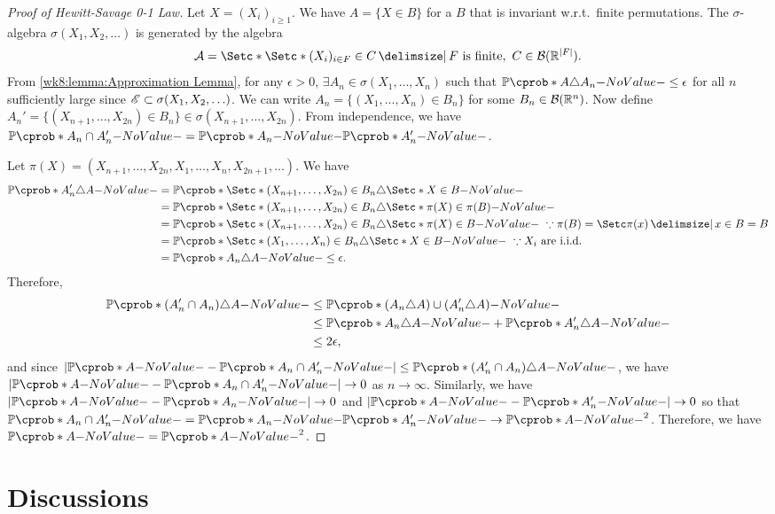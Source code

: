 \documentclass[12pt]{article}
\begin{document}
\begin{proof}[Proof of Hewitt-Savage 0-1 Law]
Let $X=(X_i)_{i\geq 1}$. We have $A=\{X\in B\}$ for a $B$ that is invariant w.r.t.\ finite permutations. The $\sigma$-algebra $\sigma(X_1,X_2,\ldots)$ is generated by the algebra
\begin{align*}
\calA = \set*{\set*{(X_i)_{i\in F}\in C} \given F \text{ is finite},\ C\in \calB(\Real^{|F|})}.
\end{align*}
From \cref{wk8:lemma:Approximation Lemma}, for any $\epsilon>0$, $\exists A_n \in \sigma(X_1,\ldots,X_n)$ such that $\P(A\triangle A_n)\leq \epsilon$ for all $n$ sufficiently large since $\mathscr{E} \subset \sigma(X_1,X_2,\ldots)$. We can write $A_n=\{ (X_1,\ldots, X_n)\in B_n\}$ for some $B_n\in \mathcal{B} (\mathbb{R} ^n)$. Now define $A_n'=\{(X_{n+1},\ldots, X_{2n})\in B_n\}\in \sigma( X_{n+1},\ldots,X_{2n})$. From independence, we have $\P(A_n\cap A_n')=\P(A_n)\P(A_n')$.  

Let $\pi(X) = (X_{n+1},\ldots,X_{2n},X_{1},\ldots,X_{n},X_{2n+1},\ldots)$. We have 
\begin{align*}
\P(A_n'\triangle A)
&=\P(\set*{(X_{n+1},\ldots,X_{2n})\in B_n}\triangle \set*{X\in B})\\
&=\P(\set*{(X_{n+1},\ldots,X_{2n})\in B_n}\triangle \set*{\pi(X)\in \pi(B)})\\
&=\P(\set*{(X_{n+1},\ldots,X_{2n})\in B_n}\triangle \set*{\pi(X)\in B})\ \because \pi(B)=\set{\pi(x)\given x\in B}=B\\
&=\P(\set*{(X_{1},\ldots,X_{n})\in B_n}\triangle \set*{X\in B})\ \because X_i \text{ are i.i.d.}\\
&=\P(A_n \triangle A) \leq \epsilon.
\end{align*}
Therefore,
\begin{align*}
\P((A_n'\cap A_n)\triangle A) &\leq \P((A_n\triangle A) \cup (A_n'\triangle A))\\
&\leq \P(A_n\triangle A) +\P (A_n'\triangle A)\\
&\leq 2\epsilon,
\end{align*}
and since $|\P(A)-\P(A_n\cap A_n')|\leq \P((A_n'\cap A_n)\triangle A)$, we have $|\P(A)-\P(A_n\cap A_n')|\to 0$ as $n \to \infty$. Similarly, we have $|\P(A)-\P(A_n)|\to 0$ and $|\P(A)-\P(A_n')|\to 0$ so that $\P(A_n\cap A_n')=\P(A_n)\P(A_n') \to \P(A)^2$. Therefore, we have $\P(A)=\P(A)^2$.
\end{proof}


\section{Discussions}
\end{document}

